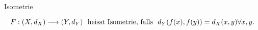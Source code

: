 \documentclass[class=article, crop=false]{standalone}
\begin{document}
\begin{zettel}{Isometrie}
\begin{flashcard}
    \begin{definition}[Isometrie]
        \[
            F: (X,d_X) \longrightarrow (Y, d_Y)   \tx{ heisst Isometrie, falls } d_Y(f(x), f(y)) = d_X (x,y) \forall x,y
        .\]
    \end{definition}
\end{flashcard}
\end{zettel}
\end{document}
